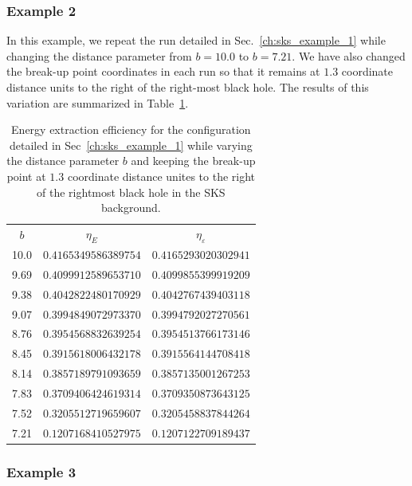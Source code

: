 \subsubsection{Example 2}
\label{ch:sks_example_2}

In this example, we repeat the run detailed in Sec.~\ref{ch:sks_example_1} while changing the distance parameter from $b=10.0$ to $b = 7.21$. We have also changed the break-up point coordinates in each run so that it remains at $1.3$ coordinate distance units to the right of the right-most black hole. The results of this variation are summarized in Table~\ref{tab:arbitrary_penrose_sks_example_results_d_variation}.

\begin{table}[]
  \centering
  \begin{tabular}{ccc}
    \hline\hline
    $b$  & $\eta_E$             & $\eta_\varepsilon$   \\
    10.0 & $0.4165349586389754$ & $0.4165293020302941$ \\
    9.69 & $0.4099912589653710$ & $0.4099855399919209$ \\
    9.38 & $0.4042822480170929$ & $0.4042767439403118$ \\
    9.07 & $0.3994849072973370$ & $0.3994792027270561$ \\
    8.76 & $0.3954568832639254$ & $0.3954513766173146$ \\
    8.45 & $0.3915618006432178$ & $0.3915564144708418$ \\
    8.14 & $0.3857189791093659$ & $0.3857135001267253$ \\
    7.83 & $0.3709406424619314$ & $0.3709350873643125$ \\
    7.52 & $0.3205512719659607$ & $0.3205458837844264$ \\
    7.21 & $0.1207168410527975$ & $0.1207122709189437$ \\ \hline\hline
  \end{tabular}
  \caption{Energy extraction efficiency for the configuration detailed in Sec~\ref{ch:sks_example_1} while varying the distance parameter $b$ and keeping the break-up point at $1.3$ coordinate distance unites to the right of the rightmost black hole in the \ac{SKS} background.}
  \label{tab:arbitrary_penrose_sks_example_results_d_variation}
\end{table}

\subsubsection{Example 3}
\label{ch:sks_example_3}

